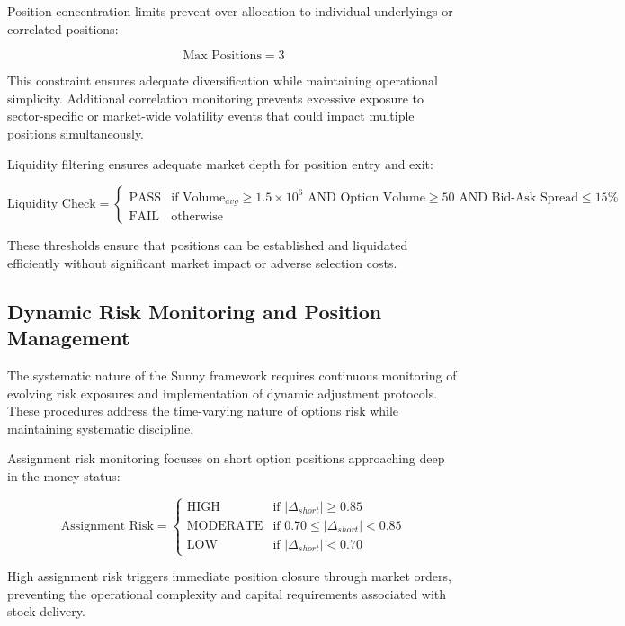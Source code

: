 \documentclass[
  american,
  11pt,
  11pt,
  letterpaper,
  onecolumn]{article}
\begin{document}
Position concentration limits prevent over-allocation to individual
underlyings or correlated positions:

\[\text{Max Positions} = 3\]

This constraint ensures adequate diversification while maintaining
operational simplicity. Additional correlation monitoring prevents
excessive exposure to sector-specific or market-wide volatility events
that could impact multiple positions simultaneously.

Liquidity filtering ensures adequate market depth for position entry and
exit:

\[\text{Liquidity Check} = \begin{cases}
\text{PASS} & \text{if } \text{Volume}_{avg} \geq 1.5 \times 10^6 \text{ AND } \text{Option Volume} \geq 50 \text{ AND } \text{Bid-Ask Spread} \leq 15\% \\
\text{FAIL} & \text{otherwise}
\end{cases}\]

These thresholds ensure that positions can be established and liquidated
efficiently without significant market impact or adverse selection
costs.

\subsection{Dynamic Risk Monitoring and Position
Management}\label{dynamic-risk-monitoring-and-position-management}

The systematic nature of the Sunny framework requires continuous
monitoring of evolving risk exposures and implementation of dynamic
adjustment protocols. These procedures address the time-varying nature
of options risk while maintaining systematic discipline.

Assignment risk monitoring focuses on short option positions approaching
deep in-the-money status:

\[\text{Assignment Risk} = \begin{cases}
\text{HIGH} & \text{if } |\Delta_{short}| \geq 0.85 \\
\text{MODERATE} & \text{if } 0.70 \leq |\Delta_{short}| < 0.85 \\
\text{LOW} & \text{if } |\Delta_{short}| < 0.70
\end{cases}\]

High assignment risk triggers immediate position closure through market
orders, preventing the operational complexity and capital requirements
associated with stock delivery.
\end{document}
